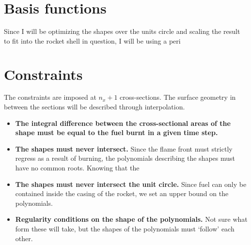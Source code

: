 \documentclass[11pt]{article}
\begin{document}
\section{Basis functions}

Since I will be optimizing the shapes over the units circle and scaling the result to fit into the rocket shell in question, I will be using a peri

\section{Constraints}

The constraints are imposed at $n_x+1$ cross-sections. The surface geometry in between the sections will be described through interpolation. 

\begin{itemize}
\item \textbf{The integral difference between the cross-sectional areas of the shape must be equal to the fuel burnt in a given time step. }
\item \textbf{The shapes must never intersect.} Since the flame front must strictly regress as a result of burning, the polynomials describing the shapes must have no common roots. Knowing that the 
\item\textbf{The shapes must never intersect the unit circle.} Since fuel can only be contained inside the casing of the rocket, we set an upper bound on the polynomials. 
\item \textbf{Regularity conditions on the shape of the polynomials.} Not sure what form these will take, but the shapes of the polynomials must `follow' each other. 
\end{itemize}
\end{document}

